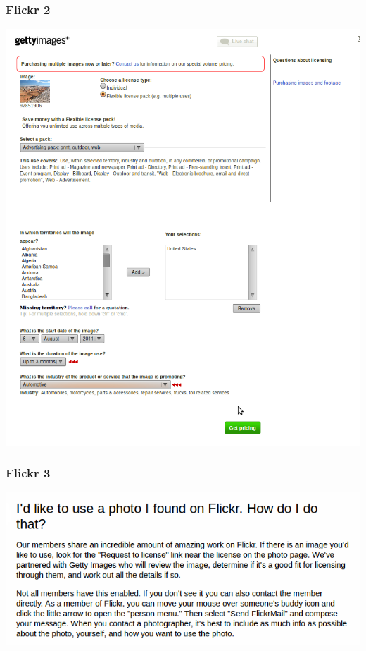 \documentclass[mathserif,xcolor=dvipsnames,hyperref={bookmarks=true}]{beamer}
\begin{document}
    \begin{frame}[t]
        \frametitle{Flickr 2}
        \begin{center}
            \includegraphics[height=0.9\textheight]{gettyimages-pricing.png}
        \end{center}
    \end{frame}
    \begin{frame}[t]
        \frametitle{Flickr 3}
        \begin{center}
            \includegraphics[height=0.9\textheight]{i-would-like-to-use-a-photo-i-found-on-flickr.png}
        \end{center}
    \end{frame}
\end{document}
